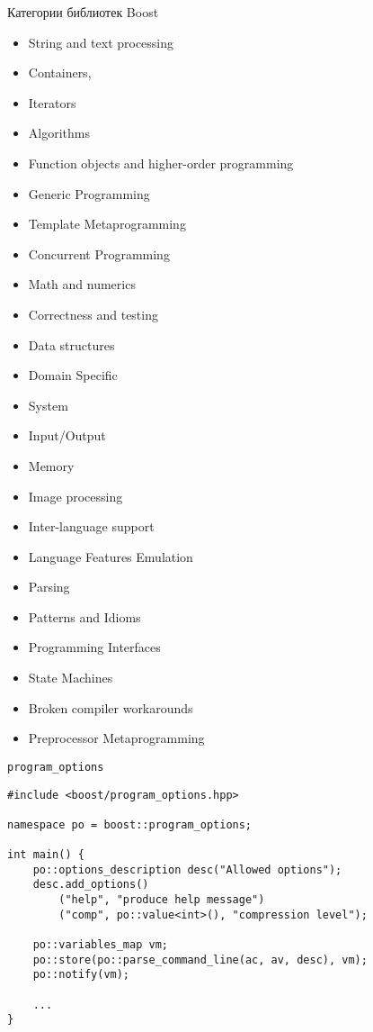 \documentclass{beamer}
\begin{document}
\begin{frame}[fragile]{Категории библиотек Boost}
\medskip
\fontsize{10pt}{0.8em}\selectfont
\begin{minipage}{.5\textwidth}

\begin{itemize}
\item String and text processing
\item Containers, 
\item Iterators
\item Algorithms
\item Function objects and higher-order programming
\item Generic Programming
\item Template Metaprogramming
\item Concurrent Programming
\item Math and numerics
\item Correctness and testing
\item Data structures
\item Domain Specific
\item System
\end{itemize}
\end{minipage}%
\begin{minipage}{.45\textwidth}
\begin{itemize}
\item Input/Output
\item Memory
\item Image processing
\item Inter-language support
\item Language Features Emulation
\item Parsing
\item Patterns and Idioms
\item Programming Interfaces
\item State Machines
\item Broken compiler workarounds
\item Preprocessor Metaprogramming
\end{itemize}
\end{minipage}%
\end{frame}

\begin{frame}[fragile]{{\tt program\_options}}
\small
\begin{lstlisting}
#include <boost/program_options.hpp> 

namespace po = boost::program_options;

int main() {
    po::options_description desc("Allowed options");
    desc.add_options()
        ("help", "produce help message")
        ("comp", po::value<int>(), "compression level");

    po::variables_map vm;
    po::store(po::parse_command_line(ac, av, desc), vm);
    po::notify(vm);    

    ...
}
\end{lstlisting}
\end{frame}
\end{document}

